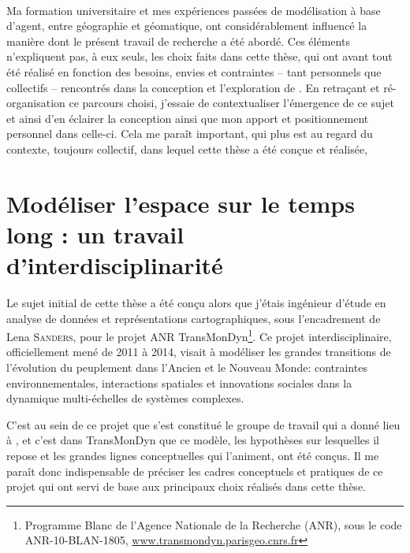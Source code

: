 \bigskip
\paragraph[Conclusion intermédiaire]{}

Ma formation universitaire et mes expériences passées de modélisation à base d'agent, entre géographie et géomatique, ont considérablement influencé la manière dont le présent travail de recherche a été abordé.
Ces éléments n'expliquent pas, à eux seuls, les choix faits dans cette thèse, qui ont avant tout été réalisé en fonction des besoins, envies et contraintes -- tant personnels que collectifs -- rencontrés dans la conception et l'exploration de \simfeodal{}.
En retraçant et ré-organisation ce parcours choisi, j'essaie de contextualiser l'émergence de ce sujet et ainsi d'en éclairer la conception ainsi que mon apport et positionnement personnel dans celle-ci.
Cela me paraît important, qui plus est au regard du contexte, toujours collectif, dans lequel cette thèse a été conçue et réalisée,

\section{Modéliser l'espace sur le temps long : un travail d'interdisciplinarité \label{sec:contexte}}

Le sujet initial de cette thèse a été conçu alors que j'étais ingénieur d'étude en analyse de données et représentations cartographiques, sous l'encadrement de Lena \textsc{Sanders}, pour le projet ANR TransMonDyn\footnote{
	Programme \og Blanc\fg{} de l'Agence Nationale de la Recherche (ANR), sous le code \mbox{ANR-10-BLAN-1805}, \href{http://www.transmondyn.parisgeo.cnrs.fr/}{www.transmondyn.parisgeo.cnrs.fr}
}.
Ce projet interdisciplinaire, officiellement mené de 2011 à 2014, visait à \og modéliser les grandes transitions de l'évolution du peuplement dans l'Ancien et le Nouveau Monde: contraintes environnementales, interactions spatiales et innovations sociales dans la dynamique multi-échelles de systèmes complexes\fg{}.

C'est au sein de ce projet que s'est constitué le groupe de travail qui a donné lieu à \simfeodal{}, et c'est dans TransMonDyn que ce modèle, les hypothèses sur lesquelles il repose et les grandes lignes conceptuelles qui l'animent, ont été conçus.
Il me paraît donc indispensable de préciser les cadres conceptuels et pratiques de ce projet qui ont servi de base aux principaux choix réalisés dans cette thèse.

